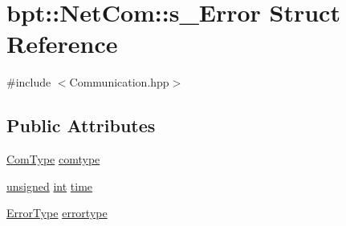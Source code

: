\hypertarget{structbpt_1_1_net_com_1_1s___error}{\section{bpt\-:\-:Net\-Com\-:\-:s\-\_\-\-Error Struct Reference}
\label{structbpt_1_1_net_com_1_1s___error}
}


{\ttfamily \#include $<$Communication.\-hpp$>$}

\subsection*{Public Attributes}
\begin{DoxyCompactItemize}
\item 
\hyperlink{namespacebpt_1_1_net_com_a73b47b2b099bf7d28997dc72c921212c}{Com\-Type} \hyperlink{structbpt_1_1_net_com_1_1s___error_ad6b991cce7ff009d5e8bf95804f7b222}{comtype}
\item 
\hyperlink{curses_8priv_8h_aca40206900cfc164654362fa8d4ad1e6}{unsigned} \hyperlink{term__entry_8h_ad65b480f8c8270356b45a9890f6499ae}{int} \hyperlink{structbpt_1_1_net_com_1_1s___error_a6438a0f6455c0034c96d6237bd0e2293}{time}
\item 
\hyperlink{namespacebpt_1_1_net_com_a401866ee6997493e98c7823af2d1bca6}{Error\-Type} \hyperlink{structbpt_1_1_net_com_1_1s___error_a9ae8c2f208e5293733004f5fc86c3cb9}{errortype}
\end{DoxyCompactItemize}


